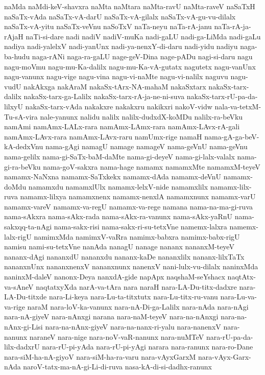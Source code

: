 {naMda
naMdi-keV-shavxra
naMta
naMtara
naMta-ravU
naMta-raveV
naSaTxH
naSaTx-vAda
naSaTx-vA-darU
naSaTx-vA-gilalx
naSaTx-vA-gu-vu-dilalx
naSaTx-vA-yitu
naSaTx-veVnu
naSoTxV
naTa-neyu
naTa-rA-janu
naTa-rA-ja-rAjaH
naTi-si-dare
nadi
nadiV
nadiV-muKa
nadi-gaLU
nadi-ga-LiMda
nadi-gaLu
nadiya
nadi-yalelxV
nadi-yanUnx
nadi-ya-nenxY-di-daru
nadi-yidu
nadiyu
naga-ba-hudu
naga-rANi
naga-ra-gaLU
nage-geV-Dina
nage-pADu
nagi-si-daru
nagu
nagu-moVmu
nagu-mu-Ka-dalilx
nagu-mu-Ka-vA-gutatx
nagutetx
nagu-vanUnx
nagu-vanunx
nagu-vige
nagu-vina
nagu-vi-naMte
nagu-vi-nalilx
naguvu
nagu-vudU
nakAkxga
nakAraM
nakaSx-tArx-NA-mahaM
nakaSxtarx
nakaSx-tarx-dalilx
nakaSx-tarx-ga-Lalilx
nakaSx-tarx-rA-ja-ne-ni-suva
nakaSx-tarx-rU-pa-da-lilxyU
nakaSx-tarx-vAda
nakakxre
nakakxru
nakikxri
nakoV-vidw
nala-va-tetxM-Tu-sA-vira
nale-yanunx
nalidu
nalilx
nalilx-dudxdX-koMDu
nalilx-ra-beVku
namAmi
namAmx-LALx-rara
namAmx-LAmx-rara
namAmx-LAvx-rA-gali
namAmx-LAvx-rara
namAmx-LAvx-raru
namUmx-rige
namaH
nama-gA-ga-beV-kA-dedxVnu
nama-gAgi
namagU
namage
namageV
nama-geVnU
nama-geVnu
nama-gelilx
nama-gi-SaTx-baM-daMte
nama-gi-deyeV
nama-gi-lalx-valalx
nama-gi-ra-beVku
nama-goV-sakxra
nama-hage
namamx
namamxMte
namamxM-teyeV
namamx-NaNxna
namamx-SaTxkekx
namamx-dAda
namamx-deVnU
namamx-doMdu
namamxdu
namamxlUlx
namamx-lelxV-nide
namamxlilx
namamx-lilx-ruva
namamx-lilxya
namamxnenx
namamx-nenxlA
namamxnunx
namamx-varU
namamx-vareV
namamx-va-regU
namamx-va-rege
namana
nama-na-ma-gi-ruva
nama-sAkxra
nama-sAkx-rada
nama-sAkx-ra-vanunx
nama-sAkx-yaRnU
nama-sakxqq-ta-nAgi
nama-sakx-risi
nama-sakx-ri-su-tetxVne
namemx-lalxra
namemx-lalx-rigU
namimxMda
namimxV-vaRra
namimx-babxra
namimx-babx-rigU
namisu
nami-su-tetxVne
nanAda
nanagU
nanage
nananx
nananxM-teyeV
nananx-dAgi
nananxdU
nananxdu
nananx-kaDe
nananxlilx
nananx-lilxTaTx
nananxnUnx
nananxnenxV
nananxnunx
nanenxV
nani-lulx-vu-dilalx
naninxMda
naninxM-daleV
nanonx-Deya
nanxdA-gide
napApx
naqshaM-seYshacx
naqtAtx-va-sAneV
naqtatxyXda
narA-va-tAra
nara
naraH
nara-LA-Du-titx-dadxre
nara-LA-Du-titxde
nara-Li-keya
nara-Lu-ta-titxtutx
nara-Lu-titx-ru-vanu
nara-Lu-va-va-rige
naraM
nara-loV-ka-vanunx
nara-nA-Di-ga-Lalilx
nara-nAda
nara-nAgi
nara-nA-giyeV
nara-nAnxgi
narana
nara-naM-teyeV
nara-na-nAnxgi
nara-na-nAnx-gi-Lisi
nara-na-nAnx-giyeV
nara-na-nanx-ri-yalu
nara-nanenxV
nara-nanunx
naraneV
nara-nige
nara-noV-vaR-nanunx
nara-nuMTeV
nara-rU-pa-da-lilx-dadxrU
nara-rU-pi-yAda
nara-rU-pi-yAgi
narara
nara-ranunx
nara-ro-Dane
nara-siM-ha-nA-giyoV
nara-siM-ha-ra-varu
nara-vAyxGarxM
nara-vAyx-Garx-nAda
naroV-tatx-ma-nA-gi-Li-di-ruva
nasa-kA-di-si-dadhx-ranunx
}
